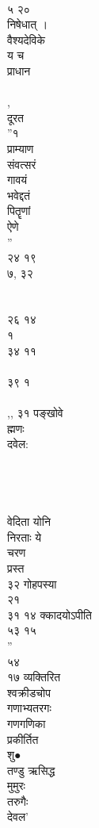 \documentclass[11pt, openany]{book}
\begin{document}
{{{{{{{{{{{{{{{{{{{{{{{{{{{{{{{{{{{{{{{{{{{{{{{{{{{{{{{{{{{{{{{{{{{{{{{{{{{{{{{{{{{{{{{{{{{{{{{{{{{{{{{{{{{\\
५ २०\\
निषेधात् ।\\
वैश्यदेविके\\
य च\\
प्राधान\\
~\\
,\\
दूरत\\
''१\\
प्राम्याण\\
संवत्सरं\\
गावयं\\
भवेद्दतं\\
पितॄणां\\
ऐणे\\
''\\
२४ १९\\
७, ३२\\
~\\
~\\
२६ १४\\
१\\
३४ ११\\
~\\
३९ १\\
~\\
,, ३१ पङ्खोवे\\
ह्मणः\\
दवेल:\\
~\\
~\\
~\\
~\\
वेदिता योनि\\
निरताः ये\\
चरण\\
प्रस्त\\
३२ गोहपस्या\\
२१\\
३१ १४ क्कादयोऽपीति\\
५३ १५\\
''\\
५४\\
१७ व्यक्तिरित\\
श्वक्रीडचोप\\
गणाभ्यतरगः\\
गणगणिका\\
प्रकीर्तित\\
शु●\\
तण्डु ऋसिद्ध\\
मुमुरः\\
तरुगैः\\
देवल'\\
}}}}}}}}}}}}}}}}}}}}}}}}}}}}}}}}}}}}}}}}}}}}}}}}}}}}}}}}}}}}}}}}}}}}}}}}}}}}}}}}}}}}}}}}}}}}}}}}}}}}}}}}}}}
\end{document}
